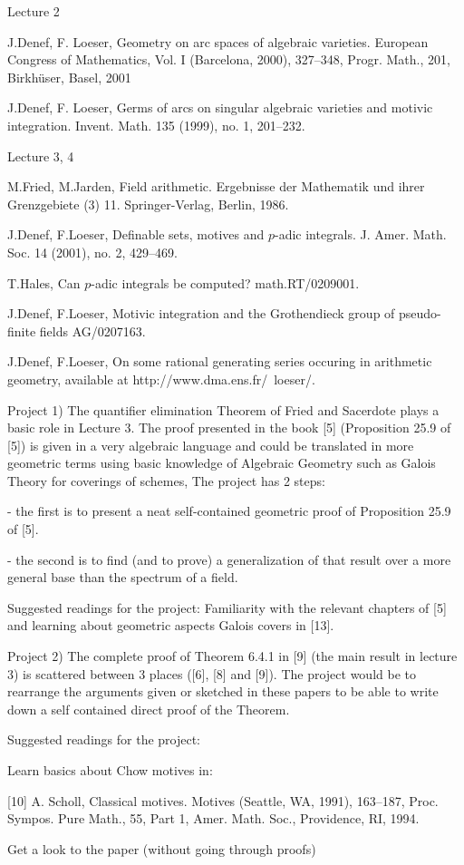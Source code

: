 \noindent Lecture 2 

\noindent [3] J.Denef, F. Loeser,
Geometry on arc spaces of algebraic varieties.
European Congress of Mathematics, Vol. I
(Barcelona, 2000), 327--348, Progr. Math., 201, Birkh\"user, Basel, 2001 







\noindent [4] J.Denef, F. Loeser,
Germs of arcs on singular algebraic varieties and motivic integration. 
Invent. Math.
135 (1999), no. 1, 201--232.

\noindent Lecture 3, 4 


\noindent [5] M.Fried, M.Jarden,
Field arithmetic. Ergebnisse der Mathematik und ihrer Grenzgebiete (3) 11. Springer-Verlag, Berlin, 1986. 

\noindent [6] J.Denef, F.Loeser,
Definable sets, motives and $p$-adic integrals.
J. Amer. Math. Soc. 14 (2001), no. 2,
429--469.

\noindent [7] T.Hales,
Can $p$-adic integrals be computed?
math.RT/0209001.


\noindent [8] J.Denef, F.Loeser,
Motivic integration and the Grothendieck group of pseudo-finite fields
AG/0207163.


\noindent [9] J.Denef, F.Loeser,
On some rational generating series occuring in arithmetic geometry,
available at 
http://www.dma.ens.fr/~loeser/.



\bigskip




\noindent Project 1)  The quantifier  elimination Theorem of
Fried and Sacerdote plays a basic role in Lecture 3.
The proof presented in the book [5] (Proposition 25.9 of [5]) 
is given in a very algebraic language
and could be translated in more geometric terms using basic
knowledge of Algebraic Geometry
such as Galois Theory for coverings of schemes, 
The project has 2 steps:

- the first is to present a neat self-contained geometric proof of 
  Proposition 25.9 of [5].

- the second is to find (and to prove)
  a generalization of that result over a more general base than the spectrum
 of a field.

Suggested readings for the project: Familiarity with the relevant chapters
of [5] and learning about geometric aspects Galois covers in 
[13].


\medskip


Project 2) The complete proof of Theorem 6.4.1 in [9]
(the main result in lecture 3) is scattered
between 3 places ([6], [8] and [9]).
The project would be to rearrange the arguments given or sketched in these
papers
to be able to write down  a self contained direct proof of the Theorem.

Suggested readings for the project:



Learn basics about Chow motives in:

[10] A. Scholl,
Classical motives. Motives (Seattle, WA, 1991), 163--187, Proc. Sympos. Pure Math., 55, Part 1, Amer.
  Math. Soc., Providence, RI, 1994. 


Get a look to the paper (without going through proofs)

